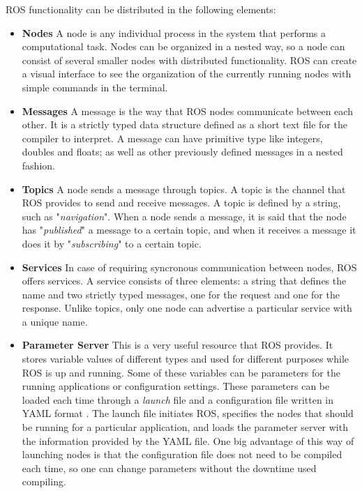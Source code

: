 ROS functionality can be distributed in the following elements:

\begin{itemize}

\item \textbf{Nodes} A node is any individual process in the system that performs a computational task. Nodes can be organized in a nested way, so a node can consist of several smaller nodes with distributed functionality. ROS can create a visual interface to see the organization of the currently running nodes with simple commands in the terminal.

\item \textbf{Messages} A message is the way that ROS nodes communicate between each other. It is a strictly typed data structure defined as a short text file for the compiler to interpret. A message can have primitive type like integers, doubles and floats; as well as other previously defined messages in a nested fashion.

\item \textbf{Topics} A node sends a message through topics. A topic is the channel that ROS provides to send and receive messages. A topic is defined by a string, such as "\emph{navigation}". When a node sends a message, it is said that the node has "\emph{published}" a message to a certain topic, and when it receives a message it does it by "\emph{subscribing}" to a certain topic.

\item \textbf{Services} In case of requiring syncronous communication between nodes, ROS offers services. A service consists of three elements: a string that defines the name and two strictly typed messages, one for the request and one for the response. Unlike topics, only one node can advertise a particular service with a unique name. 

\item \textbf{Parameter Server} This is a very useful resource that ROS provides. It stores variable values of different types and used for different purposes while ROS is up and running. Some of these variables can be parameters for the running applications or configuration settings. These parameters can be loaded each time through a \emph{launch} file and a configuration file written in YAML format \cite{Ben-kiki2004}. The launch file initiates ROS, specifies the nodes that should be running for a particular application, and loads the parameter server with the information provided by the YAML file. One big advantage of this way of launching nodes is that the configuration file does not need to be compiled each time, so one can change parameters without the downtime used compiling. 

\end{itemize}


